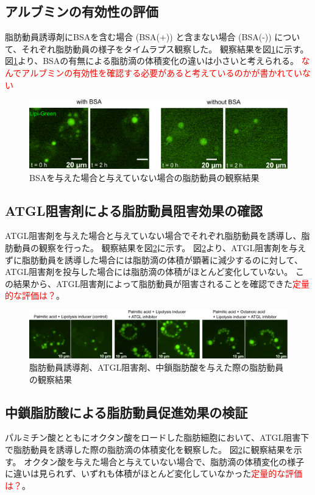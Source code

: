\documentclass[uplatex,a4paper]{jsarticle}
\begin{document}
\subsection{アルブミンの有効性の評価}
脂肪動員誘導剤にBSAを含む場合 (BSA(+)) と含まない場合 (BSA(-)) について、それぞれ脂肪動員の様子をタイムラプス観察した。
観察結果を図\ref{fig:Lipolysis_BSA}に示す。
図\ref{fig:Lipolysis_BSA}より、BSAの有無による脂肪滴の体積変化の違いは小さいと考えられる。
\textcolor{red}{なんでアルブミンの有効性を確認する必要があると考えているのかが書かれていない}

\begin{figure}[H]
	\centering
	\includegraphics[width=15cm]{figure/3_3_WorWOBSA.pdf}
	\caption{BSAを与えた場合と与えていない場合の脂肪動員の観察結果	\label{fig:Lipolysis_BSA}}
\end{figure}

\subsection{ATGL阻害剤による脂肪動員阻害効果の確認}
ATGL阻害剤を与えた場合と与えていない場合でそれぞれ脂肪動員を誘導し、脂肪動員の観察を行った。
観察結果を図\ref{fig:ATGLiMCFATest}に示す。
図\ref{fig:ATGLiMCFATest}より、ATGL阻害剤を与えずに脂肪動員を誘導した場合には脂肪滴の体積が顕著に減少するのに対して、ATGL阻害剤を投与した場合には脂肪滴の体積がほとんど変化していない。
この結果から、ATGL阻害剤によって脂肪動員が阻害されることを確認できた\textcolor{red}{定量的な評価は？}。

\begin{figure}[H]
	\centering
	\includegraphics[width=15cm]{figure/3_4_ATGLi_MCFA.pdf}
	\caption{脂肪動員誘導剤、ATGL阻害剤、中鎖脂肪酸を与えた際の脂肪動員の観察結果	\label{fig:ATGLiMCFATest}}
\end{figure}

\subsection{中鎖脂肪酸による脂肪動員促進効果の検証}
パルミチン酸とともにオクタン酸をロードした脂肪細胞において、ATGL阻害下で脂肪動員を誘導した際の脂肪滴の体積変化を観察した。
図\ref{fig:ATGLiMCFATest}に観察結果を示す。
オクタン酸を与えた場合と与えていない場合で、脂肪滴の体積変化の様子に違いは見られず、いずれも体積がほとんど変化していなかった\textcolor{red}{定量的な評価は？}。
\end{document}
